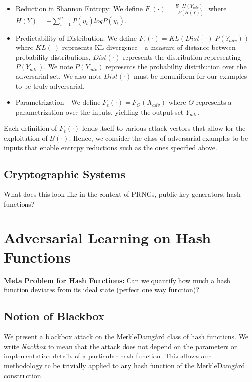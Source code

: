 \begin{itemize}
\item Reduction in Shannon Entropy: We define $F_{\epsilon} (\cdot) = \frac{E[H(Y_{adv})]}{E[H(Y)]}$ where $H(Y) = -\sum_{i=1}^{n} P(y_{i}) log P(y_{i})$.  
\item Predictability of Distribution: We define $F_{\epsilon} (\cdot) = KL(Dist (\cdot) | P(Y_{adv}))$ where $KL(\cdot)$ represents KL divergence - a measure of distance between probability distributions, $Dist(\cdot)$ represents the distribution representing $P(Y_{adv})$. We note $P(Y_{adv})$ represents the probability distribution over the adversarial set. We also note $Dist(\cdot)$ must be nonuniform for our examples to be truly adversarial. 
\item Parametrization - We define $F_{\epsilon} (\cdot) = F_{\Theta}(X_{adv})$ where $\Theta$ represents a parametrization over the inputs, yielding the output set $Y_{adv}$.
\end{itemize}



Each definition of $F_{\epsilon}(\cdot)$ lends itself to various attack vectors that allow for the exploitation of $B(\cdot)$. Hence, we consider the class of adversarial examples to be inputs that enable entropy reductions such as the ones specified above. 

\subsection{Cryptographic Systems}
What does this look like in the context of PRNGs, public key generators, hash functions?

\section{Adversarial Learning on Hash Functions}

\textbf{Meta Problem for Hash Functions:} Can we quantify how much a hash function deviates from its ideal state (perfect one way function)?

\subsection{Notion of Blackbox}
We present a blackbox attack on the Merkle{\textendash}Damg\r{a}rd class of hash functions. We write \emph{blackbox} to mean that the attack does not depend on the parameters or implementation details of a particular hash function. This allows our methodology to be trivially applied to any hash function of the Merkle{\textendash}Damg\r{a}rd construction. 

